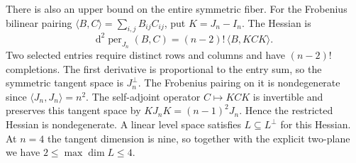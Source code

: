 There is also an upper bound on the entire symmetric fiber. For the
Frobenius bilinear pairing \(\langle B,C\rangle=\sum_{i,j}B_{ij}C_{ij}\),
put \(K=J_n-I_n\). The Hessian is
\begin{equation*}
  \mathrm d^2\!\operatorname{per}_{J_n}(B,C)
    =(n-2)!\,\langle B,KCK\rangle.
\end{equation*}
Two selected entries require distinct rows and columns and have
\((n-2)!\) completions. The first derivative is proportional to the
entry sum, so the symmetric tangent space is \(J_n^\perp\). The Frobenius
pairing on it is nondegenerate since \(\langle J_n,J_n\rangle=n^2\).
The self-adjoint operator \(C\mapsto KCK\) is invertible and preserves
this tangent space by \(KJ_nK=(n-1)^2J_n\). Hence the restricted Hessian
is nondegenerate. A linear level space satisfies \(L\subseteq L^\perp\)
for this Hessian. At \(n=4\) the tangent dimension is nine, so together
with the explicit two-plane we have \(2\le \max\dim L\le 4\).






